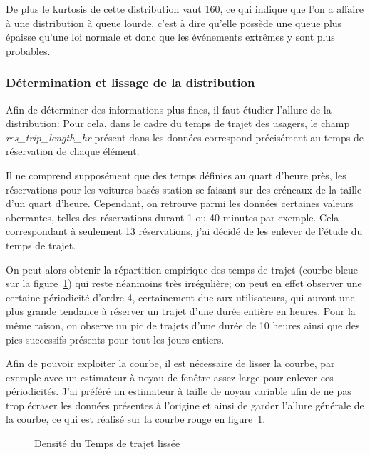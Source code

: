\documentclass[12pt,a4paper]{article}
\theoremstyle{definition}
\begin{document}
{De plus le kurtosis de cette distribution vaut 160, ce qui indique que l'on a affaire à une distribution à queue lourde, c'est à dire qu'elle possède une queue plus épaisse qu'une loi normale et donc que les événements extrêmes y sont plus probables.



\subsubsection{Détermination et lissage de la distribution}

Afin de déterminer des informations plus fines, il faut étudier l'allure de la distribution:
Pour cela, dans le cadre du temps de trajet des usagers, le champ \emph{res\_trip\_length\_hr} présent dans les données correspond précisément au temps de réservation de chaque élément.

Il ne comprend supposément que des temps définies au quart d'heure près, les réservations pour les voitures basés-station se faisant sur des créneaux de la taille d'un quart d'heure. Cependant, on retrouve parmi les données certaines valeurs aberrantes, telles des réservations durant 1 ou 40 minutes par exemple.  Cela correspondant à seulement 13 réservations, j'ai décidé de les enlever de l'étude du temps de trajet.

On peut alors obtenir la répartition empirique des temps de trajet (courbe bleue sur la figure~\ref{lissage_courbe}) qui reste néanmoins très irrégulière; on peut en effet observer une certaine périodicité d'ordre 4, certainement due aux utilisateurs, qui auront une plus grande tendance à réserver un trajet d'une durée entière en heures. Pour la même raison, on observe un pic de trajets d'une durée de 10 heures ainsi que des pics successifs présents pour tout les jours entiers.

Afin de pouvoir exploiter la courbe, il est nécessaire de lisser la courbe, par exemple avec un estimateur à noyau de fenêtre assez large pour enlever ces périodicités. J'ai préféré un estimateur à taille de noyau variable afin de ne pas trop écraser les données présentes à l'origine et ainsi de garder l'allure générale de la courbe, ce qui est réalisé sur la courbe rouge en figure~\ref{lissage_courbe}.


\begin{figure} [h]
\label{lissage_courbe}
\centering
{}
\caption{Densité du Temps de trajet lissée}
\end{figure}


}
\end{document}
